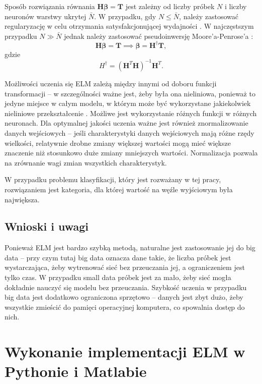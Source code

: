 \documentclass{article}
\begin{document}
Sposób rozwiązania równania $\bm{H}\bm{\beta}=\bm{T}$ jest zależny od liczby próbek $N$ i liczby neuronów warstwy ukrytej $\bar{N}$. W przypadku, gdy $N \leq \bar{N}$, należy zastosować regularyzację w celu otrzymania satysfakcjonującej wydajności \cite{akusok-hpelm}. W najczęstszym przypadku $N \gg \bar{N}$ jednak należy zastosować pseudoinwersję Moore'a-Penrose'a \cite{huang-elm-base:ta}:
\begin{equation}
\bm{H}\bm{\beta}=\bm{T} \implies \bm{\beta}=\bm{H}^{\dagger}\bm{T},
\end{equation}
gdzie 
\begin{equation}
{H}^{\dagger} = (\bm{H}^T \bm{H})^{-1}\bm{H}^T.
\end{equation}

Możliwości uczenia się ELM zależą między innymi od doboru funkcji transformacji -- w szczególności ważne jest, żeby była ona nieliniowa, ponieważ to jedyne miejsce w całym modelu, w którym może być wykorzystane jakiekolwiek nieliniowe przekształcenie \cite{akusok-hpelm}. Możliwe jest wykorzystanie różnych funkcji w różnych neuronach. Dla optymalnej jakości uczenia ważne jest również znormalizowanie danych wejściowych -- jeśli charakterystyki danych wejściowych mają różne rzędy wielkości, relatywnie drobne zmiany większej wartości mogą mieć większe znaczenie niż stosunkowo duże zmiany mniejszych wartości. Normalizacja pozwala na zrównanie wagi zmian wszystkich charakterystyk. \par

W przypadku problemu klasyfikacji, który jest rozważany w tej pracy, rozwiązaniem jest kategoria, dla której wartość na węźle wyjściowym była największa. 
\subsection{Wnioski i uwagi}
Ponieważ ELM jest bardzo szybką metodą, naturalne jest zastosowanie jej do big data -- przy czym tutaj big data oznacza dane takie, że liczba próbek jest wystarczająca, żeby wytrenować sieć bez przeuczania jej, a ograniczeniem jest tylko czas. W przypadku small data próbek jest za mało, żeby sieć mogła dokładnie nauczyć się modelu bez przeuczania. Szybkość uczenia w przypadku big data jest dodatkowo ograniczona sprzętowo -- danych jest zbyt dużo, żeby wszystkie zmieścić do pamięci operacyjnej komputera, co spowalnia dostęp do nich.

\clearpage
\section{Wykonanie implementacji ELM w Pythonie i Matlabie}
\end{document}
